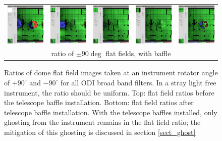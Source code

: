 \documentclass[]{spieman}
\begin{document}
\begin{figure}
\begin{tabular}{ccccc}
			
			\includegraphics[width=0.18\columnwidth]{images/baffle_u.png} &
			\includegraphics[width=0.18\columnwidth]{images/baffle_g.png} &
			\includegraphics[width=0.18\columnwidth]{images/baffle_r.png} &
			\includegraphics[width=0.18\columnwidth]{images/baffle_i.png} &
			\includegraphics[width=0.18\columnwidth]{images/baffle_z.png} 
			\\[1ex] 
			\multicolumn{5}{c}{ratio of $\pm 90 \deg$ flat
				fields, with baffle} \\[2ex] 
		\end{tabular}
		
		\caption{\label{fig_flatfieldbaffle} Ratios of dome flat field 
			images
			taken at an instrument rotator angle of $+90^\circ$ and 
			$-90^\circ$ 
			for all ODI broad band filters. In a stray light free  
			instrument, the ratio should 
			be uniform. Top: flat field ratios before the telescope baffle 
			installation. 
			Bottom: flat field ratios after telescope baffle installation. 
			With the telescope 
			baffles installed, only ghosting from the instrument remains in 
			the flat field 
			ratio; the mitigation of this ghosting is discussed in section 
			\ref{sect_ghost} }
		
	\end{figure}
\end{document}
